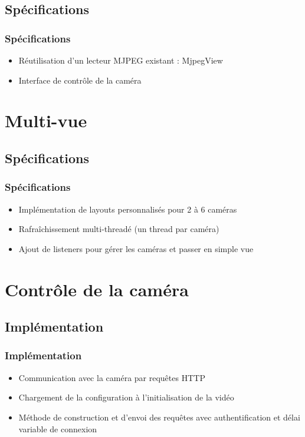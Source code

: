 \documentclass{beamer}
\begin{document}
\subsection{Spécifications}
 \begin{frame}
   \frametitle{Spécifications}
   \begin{itemize}
    \item<2-> Réutilisation d'un lecteur MJPEG existant : MjpegView
    \item<3-> Interface de contrôle de la caméra
    \end{itemize}
\end{frame}

\section{Multi-vue}
\subsection{Spécifications}
 \begin{frame}
   \frametitle{Spécifications}
   \begin{itemize}
    \item<2-> Implémentation de layouts personnalisés pour 2 à 6 caméras
    \item<3-> Rafraîchissement multi-threadé (un thread par caméra)
    \item<4-> Ajout de listeners pour gérer les caméras et passer en simple vue 
    \end{itemize}
\end{frame}

\section{Contrôle de la caméra}
\subsection{Implémentation}
 \begin{frame}
   \frametitle{Implémentation}
   \begin{itemize}
    \item<2-> Communication avec la caméra par requêtes HTTP
    \item<3-> Chargement de la configuration à l'initialisation de la vidéo
    \item<4-> Méthode de construction et d'envoi des requêtes avec
    authentification et délai variable de connexion
   \end{itemize}
\end{frame}
\end{document}

